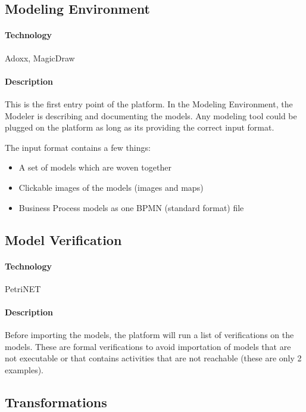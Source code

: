 \documentclass{learnpad}
\begin{document}
\subsection{Modeling Environment}
\label{sec:modeling-environment}

\paragraph{Technology}
Adoxx, MagicDraw

\paragraph{Description}
This is the first entry point of the platform.  In the Modeling Environment, the
Modeler is describing and documenting the models.  Any modeling tool could be
plugged on the \learnpad platform as long as its providing the correct input
format.

The input format contains a few things:
\begin{itemize}
	\item A set of models which are woven together
	\item Clickable images of the models (images and maps)
	\item Business Process models as one BPMN (standard format) file
\end{itemize}

\subsection{Model Verification}
\label{sec:model-verification}

\paragraph{Technology}
PetriNET

\paragraph{Description}
Before importing the models, the \learnpad platform will run a list of
verifications on the models.  These are formal verifications to avoid
importation of models that are not executable or that contains activities that
are not reachable (these are only 2 examples).

\subsection{Transformations}
\label{sec:transformations}
\end{document}
